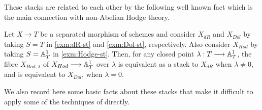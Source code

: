 \documentclass[11pt]{amsart}
\begin{document}
These stacks are related to each other by the following well known fact which
is the main connection with non-Abelian Hodge theory.

\begin{prop}
Let $X \to T$ be a separated morphism of schemes and consider
$X_{dR}$ and $X_{Dol}$ by taking $S = T$ in \cref{exm:dR-st} and
\cref{exm:Dol-st}, respectively.
Also consider $X_{Hod}$ by taking $S = \mathbb{A}^1_T$ in
\cref{exm:Hodge-st}. Then, for any closed point $\lambda : T \to \bA^1_T$,
the fibre $X_{Hod, \lambda}$ of $X_{Hod} \to \bA^{1}_T$ over $\lambda$ is
equivalent as a stack to $X_{dR}$ when $\lambda \neq 0$, and is equivalent to
$X_{Dol}$, when $\lambda = 0$.
\end{prop}

We also record here some basic facts about these stacks that make it difficult
to apply some of the techniques of \cite{ModQuivBun} directly.
\end{document}
